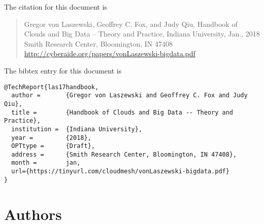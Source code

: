 The citation for this document is 

\begin{quote}
  Gregor von Laszewski, Geoffrey C. Fox, and Judy Qiu, Handbook of
  Clouds and Big Data -- Theory and Practice, Indiana University,
  Jan., 2018 Smith Research Center, Bloomington, IN 47408
  \url{http://cyberaide.org/papers/vonLaszewski-bigdata.pdf}
\end{quote}

The bibtex entry for this document is

\begin{verbatim}
@TechReport{las17handbook,
  author =       {Gregor von Laszewski and Geoffrey C. Fox and Judy Qiu},
  title =        {Handbook of Clouds and Big Data -- Theory and Practice},
  institution =  {Indiana University},
  year =         {2018},
  OPTtype =      {Draft},
  address =      {Smith Research Center, Bloomington, IN 47408},
  month =        jan,
  url={https://tinyurl.com/cloudmesh/vonLaszewski-bigdata.pdf} 
}
\end{verbatim}



\section{Authors}

\FILENAME

